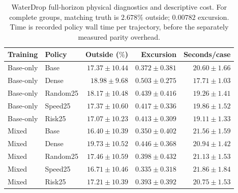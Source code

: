 \begin{table}[!ht]
\centering\small
\setlength{\tabcolsep}{5pt}\renewcommand{\arraystretch}{1.12}
\caption{WaterDrop full-horizon physical diagnostics and descriptive cost. For complete groups, matching truth is $2.678\%$ outside; $0.00782$ excursion. Time is recorded policy wall time per trajectory, before the separately measured parity overhead.}
\label{tab:waterdrop110k-cost}
\begin{tabular}{llrrr}
\toprule
Training & Policy & Outside ($\%$) & Excursion & Seconds/case\\
\midrule
Base-only & Base & $17.37\pm10.44$ & $0.372\pm0.381$ & $20.60\pm1.66$\\
Base-only & Dense & $18.98\pm9.68$ & $0.503\pm0.275$ & $17.71\pm1.03$\\
Base-only & Random25 & $18.17\pm10.48$ & $0.439\pm0.416$ & $19.26\pm1.41$\\
Base-only & Speed25 & $17.37\pm10.60$ & $0.417\pm0.336$ & $19.86\pm1.52$\\
Base-only & Risk25 & $17.07\pm10.23$ & $0.413\pm0.309$ & $19.11\pm1.33$\\
Mixed & Base & $16.40\pm10.39$ & $0.350\pm0.402$ & $21.56\pm1.59$\\
Mixed & Dense & $19.73\pm10.52$ & $0.446\pm0.368$ & $20.94\pm1.42$\\
Mixed & Random25 & $17.46\pm10.59$ & $0.398\pm0.432$ & $21.13\pm1.53$\\
Mixed & Speed25 & $16.71\pm10.46$ & $0.335\pm0.318$ & $21.86\pm1.84$\\
Mixed & Risk25 & $17.21\pm10.39$ & $0.393\pm0.392$ & $20.75\pm1.53$\\
\bottomrule
\end{tabular}
\end{table}

